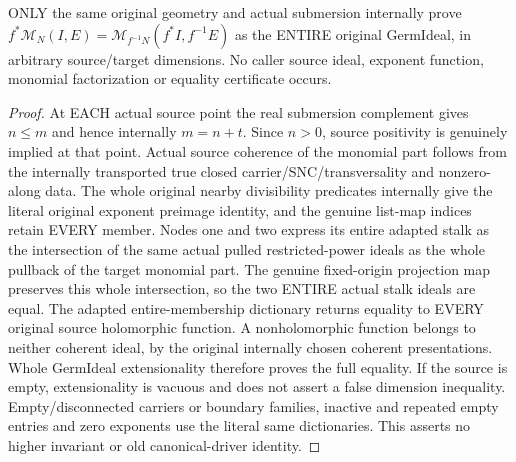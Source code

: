 \begin{theorem}
\label{hir:submersion-relative-parts-whole-monomial}
\leanok
ONLY the same original geometry and actual submersion internally prove
$f^*\mathcal M_N(I,E)=\mathcal M_{f^{-1}N}(f^*I,f^{-1}E)$ as the ENTIRE
original GermIdeal, in arbitrary source/target dimensions. No caller source
ideal, exponent function, monomial factorization or equality certificate occurs.
\end{theorem}
\begin{proof}
At EACH actual source point the real submersion complement gives $n\le m$
and hence internally $m=n+t$. Since $n>0$, source positivity is genuinely
implied at that point. Actual source coherence of the monomial part follows
from the internally transported true closed carrier/SNC/transversality and
nonzero-along data. The whole original nearby divisibility predicates internally give the literal
original exponent preimage identity, and the genuine list-map indices retain
EVERY member. Nodes one and two express its entire adapted stalk as
the intersection of the same actual pulled restricted-power ideals as the
whole pullback of the target monomial part. The genuine fixed-origin
projection map preserves this whole intersection, so the two ENTIRE
actual stalk ideals are equal. The adapted entire-membership dictionary
returns equality to EVERY original source holomorphic function. A
nonholomorphic function belongs to neither coherent ideal, by the original
internally chosen coherent presentations. Whole GermIdeal extensionality
therefore proves the full equality. If the source is empty, extensionality
is vacuous and does not assert a false dimension inequality. Empty/disconnected
carriers or boundary families, inactive and repeated empty entries and zero
exponents use the literal same dictionaries. This asserts no higher
invariant or old canonical-driver identity.
\end{proof}

